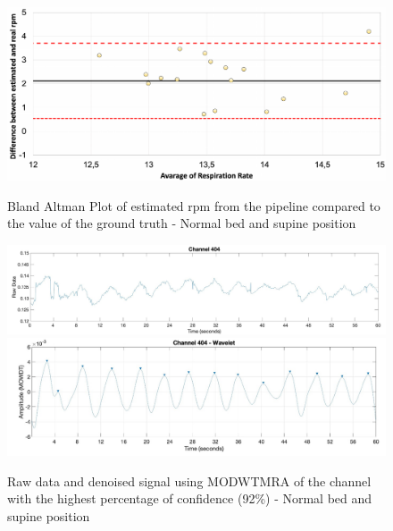 \begin{figure}[p]
  \centering
  \includegraphics[width=\textwidth]{img/balnd1.pdf}

  \caption{Bland Altman Plot of estimated rpm from the pipeline compared to the value of the ground truth - Normal bed and supine position}
  \label{fig:baln1}
  \vspace{1.5cm}
  \includegraphics[width=\textwidth]{img/404.jpg}
  \includegraphics[width=\textwidth]{img/404_wave.jpg}
\caption{Raw data and denoised signal using MODWTMRA of the channel with the highest percentage of confidence (92\%) - Normal bed and supine position}
  \label{fig:rec}
\end{figure}